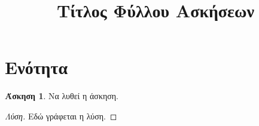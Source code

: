 \documentclass[12pt,a4paper]{article}
\title{Τίτλος Φύλλου Ασκήσεων}
\author{}
\date{}
\theoremstyle{definition}
\newtheorem{exercise}{Άσκηση}[section]
\newenvironment{solution}{\begin{proof}[Λύση]}{\end{proof}}
\begin{document}
\maketitle

\section{Ενότητα}

\begin{exercise}
Να λυθεί η άσκηση.
\end{exercise}

\begin{solution}
Εδώ γράφεται η λύση.
\end{solution}
\end{document}
